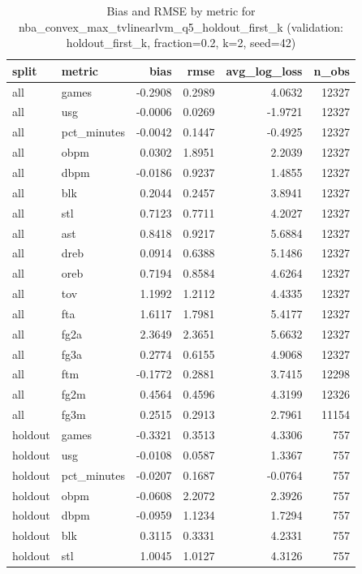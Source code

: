 \begin{table}
\caption{Bias and RMSE by metric for nba_convex_max_tvlinearlvm_q5_holdout_first_k (validation: holdout_first_k, fraction=0.2, k=2, seed=42)}
\label{tab:nba_convex_max_tvlinearlvm_q5_holdout_first_k_vs_holdout_first_k_f20_k2_s42_bias_rmse}
\begin{tabular}{llrrrr}
\toprule
split & metric & bias & rmse & avg\_log\_loss & n\_obs \\
\midrule
all & games & -0.2908 & 0.2989 & 4.0632 & 12327 \\
all & usg & -0.0006 & 0.0269 & -1.9721 & 12327 \\
all & pct\_minutes & -0.0042 & 0.1447 & -0.4925 & 12327 \\
all & obpm & 0.0302 & 1.8951 & 2.2039 & 12327 \\
all & dbpm & -0.0186 & 0.9237 & 1.4855 & 12327 \\
all & blk & 0.2044 & 0.2457 & 3.8941 & 12327 \\
all & stl & 0.7123 & 0.7711 & 4.2027 & 12327 \\
all & ast & 0.8418 & 0.9217 & 5.6884 & 12327 \\
all & dreb & 0.0914 & 0.6388 & 5.1486 & 12327 \\
all & oreb & 0.7194 & 0.8584 & 4.6264 & 12327 \\
all & tov & 1.1992 & 1.2112 & 4.4335 & 12327 \\
all & fta & 1.6117 & 1.7981 & 5.4177 & 12327 \\
all & fg2a & 2.3649 & 2.3651 & 5.6632 & 12327 \\
all & fg3a & 0.2774 & 0.6155 & 4.9068 & 12327 \\
all & ftm & -0.1772 & 0.2881 & 3.7415 & 12298 \\
all & fg2m & 0.4564 & 0.4596 & 4.3199 & 12326 \\
all & fg3m & 0.2515 & 0.2913 & 2.7961 & 11154 \\
holdout & games & -0.3321 & 0.3513 & 4.3306 & 757 \\
holdout & usg & -0.0108 & 0.0587 & 1.3367 & 757 \\
holdout & pct\_minutes & -0.0207 & 0.1687 & -0.0764 & 757 \\
holdout & obpm & -0.0608 & 2.2072 & 2.3926 & 757 \\
holdout & dbpm & -0.0959 & 1.1234 & 1.7294 & 757 \\
holdout & blk & 0.3115 & 0.3331 & 4.2331 & 757 \\
holdout & stl & 1.0045 & 1.0127 & 4.3126 & 757 \\

\end{tabular}
\end{table}

